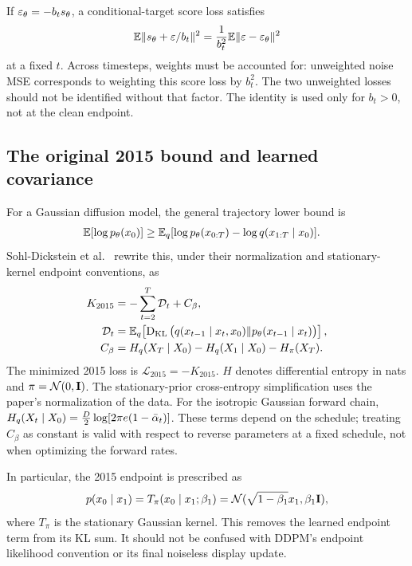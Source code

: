 If $\varepsilon_\theta=-b_ts_\theta$, a conditional-target score loss satisfies
\begin{equation}
\mathbb{E}\|s_\theta+\varepsilon/b_t\|^2
=\frac{1}{b_t^2}\mathbb{E}\|\varepsilon-\varepsilon_\theta\|^2
\end{equation}
at a fixed $t$. Across timesteps, weights must be accounted for:
unweighted noise MSE corresponds to weighting this score loss by $b_t^2$.
The two unweighted losses should not be identified without that factor.
The identity is used only for $b_t>0$, not at the clean endpoint.

\subsection{The original 2015 bound and learned covariance}\label{app:originalbound}
For a Gaussian diffusion model, the general trajectory lower bound is
\begin{equation}
\begin{aligned}
\mathbb{E}[\log p_\theta(x_0)]&\geq
\mathbb{E}_q[\log p_\theta(x_{0:T})-\log q(x_{1:T}\mid x_0)].
\end{aligned}
\end{equation}
Sohl-Dickstein et al.\ \cite[Sec.~2.4, App.~B]{sohl2015diffusion}
rewrite this, under their normalization and stationary-kernel endpoint
conventions, as
\begin{align}
K_{2015}&=-\sum_{t=2}^T\mathcal D_t+C_\beta,\nonumber\\
\mathcal D_t&=\mathbb{E}_q\!\left[\operatorname{D_{KL}}\big(q(x_{t-1}\mid x_t,x_0)
\|p_\theta(x_{t-1}\mid x_t)\big)\right],\nonumber\\
C_\beta&=H_q(X_T\mid X_0)-H_q(X_1\mid X_0)-H_\pi(X_T).
\end{align}
The minimized 2015 loss is $\mathcal L_{2015}=-K_{2015}$.
$H$ denotes differential entropy in nats and $\pi=\mathcal{N}(0,\mathbf{I})$.
The stationary-prior cross-entropy simplification uses the paper's
normalization of the data. For the isotropic Gaussian forward chain,
$H_q(X_t\mid X_0)=\tfrac D2\log[2\pi e(1-\bar{\alpha}_t)]$.
These terms depend on the schedule; treating $C_\beta$ as constant is
valid with respect to reverse parameters at a fixed schedule, not when
optimizing the forward rates.

In particular, the 2015 endpoint is prescribed as
\begin{equation}
p(x_0\mid x_1)=T_\pi(x_0\mid x_1;\beta_1)
=\mathcal{N}(\sqrt{1-\beta_1}x_1,\beta_1\mathbf{I}),
\end{equation}
where $T_\pi$ is the stationary Gaussian kernel. This removes the learned
endpoint term from its KL sum. It should not be confused with DDPM's
endpoint likelihood convention or its final noiseless display update.

